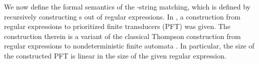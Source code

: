 


%
%

 
 
We now define the formal semantics of the \regexp-string matching, which  is defined by recursively constructing {\PSST}s out of regular expressions. In \cite{BDM14,BM17}, a construction from regular expressions to prioritized finite transducers (PFT) was given. The construction therein is a variant of the classical Thompson construction from regular expressions to nondeterministic finite automata \cite{Thompson68}. In particular, the size of the constructed PFT is linear in the size of the given regular expression. 
%

